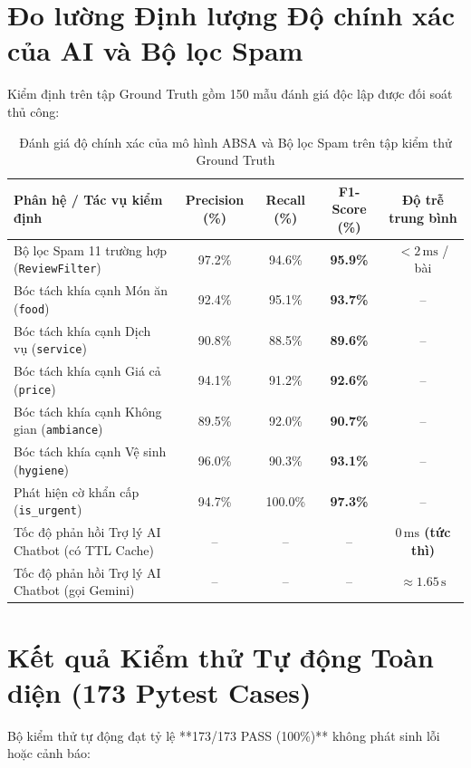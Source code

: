 \documentclass[12pt, a4paper, oneside]{book}
\begin{document}
\section{Đo lường Định lượng Độ chính xác của AI và Bộ lọc Spam}
Kiểm định trên tập Ground Truth gồm 150 mẫu đánh giá độc lập được đối soát thủ công:

\begin{table}[H]
\centering
\caption{Đánh giá độ chính xác của mô hình ABSA và Bộ lọc Spam trên tập kiểm thử Ground Truth}
\label{tab:evaluation_metrics}
\vspace{0.15cm}
\footnotesize
\begin{tabularx}{\textwidth}{l c c c c}
\toprule
\rowcolor{blue!8}
\textbf{Phân hệ / Tác vụ kiểm định} & \textbf{Precision (\%)} & \textbf{Recall (\%)} & \textbf{F1-Score (\%)} & \textbf{Độ trễ trung bình} \\
\midrule
Bộ lọc Spam 11 trường hợp (\texttt{ReviewFilter}) & 97.2\% & 94.6\% & \textbf{95.9\%} & $< 2\,\mathrm{ms}$ / bài \\
Bóc tách khía cạnh Món ăn (\texttt{food}) & 92.4\% & 95.1\% & \textbf{93.7\%} & -- \\
Bóc tách khía cạnh Dịch vụ (\texttt{service}) & 90.8\% & 88.5\% & \textbf{89.6\%} & -- \\
Bóc tách khía cạnh Giá cả (\texttt{price}) & 94.1\% & 91.2\% & \textbf{92.6\%} & -- \\
Bóc tách khía cạnh Không gian (\texttt{ambiance}) & 89.5\% & 92.0\% & \textbf{90.7\%} & -- \\
Bóc tách khía cạnh Vệ sinh (\texttt{hygiene}) & 96.0\% & 90.3\% & \textbf{93.1\%} & -- \\
Phát hiện cờ khẩn cấp (\texttt{is\_urgent}) & 94.7\% & 100.0\% & \textbf{97.3\%} & -- \\
Tốc độ phản hồi Trợ lý AI Chatbot (có TTL Cache) & -- & -- & -- & \textbf{$0\,\mathrm{ms}$ (tức thì)} \\
Tốc độ phản hồi Trợ lý AI Chatbot (gọi Gemini) & -- & -- & -- & $\approx 1.65\,\mathrm{s}$ \\
\bottomrule
\end{tabularx}
\end{table}

\section{Kết quả Kiểm thử Tự động Toàn diện (173 Pytest Cases)}
Bộ kiểm thử tự động đạt tỷ lệ **173/173 PASS (100\%)** không phát sinh lỗi hoặc cảnh báo:
\end{document}

